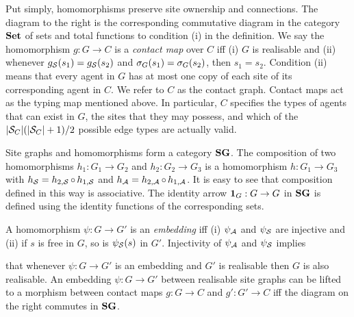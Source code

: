 Put simply, homomorphisms preserve site ownership and connections.
The diagram to the right is the corresponding
commutative diagram in the category $\mathbf{Set}$
of sets and total functions
to condition (i) in the definition.
We say the homomorphism $g: G \to C$ is
a \emph{contact map} over $C$ iff
(i) $G$ is realisable and
(ii) whenever $g_{\mathcal{S}}(s_1) = g_{\mathcal{S}}(s_2)$
and $\sigma_G(s_1) = \sigma_G(s_2)$, then $s_1 = s_2$.
Condition (ii) means that every agent in $G$ has at most
one copy of each site of its corresponding agent in $C$.
We refer to $C$ as the contact graph.
Contact maps act as the typing map mentioned above.
In particular,
$C$ specifies the types of agents that can exist in $G$,
the sites that they may possess,
and which of the $|\mathcal{S}_C|(|\mathcal{S}_C|+1)/2$
possible edge types are actually valid.

Site graphs and homomorphisms form a category $\mathbf{SG}$.
The composition of two homomorphisms
$h_1: G_1 \to G_2$ and $h_2: G_2 \to G_3$
is a homomorphism $h: G_1 \to G_3$ with
$h_{\mathcal{S}} = h_{2,\mathcal{S}} \operatorname*{\circ} h_{1,\mathcal{S}}$ and
$h_{\mathcal{A}} = h_{2,\mathcal{A}} \operatorname*{\circ} h_{1,\mathcal{A}}$.
It is easy to see that composition defined in this way is associative.
The identity arrow $\boldsymbol{\mathbf{1}}_G: G \to G$ in $\mathbf{SG}$ is defined
using the identity functions of the corresponding sets.

A homomorphism $\psi: G \to G'$ is an \emph{embedding} iff
(i) $\psi_{\mathcal{A}}$ and $\psi_{\mathcal{S}}$ are injective and
(ii) if $s$ is free in $G$, so is $\psi_{\mathcal{S}}(s)$ in $G'$.
Injectivity of $\psi_{\mathcal{A}}$ and $\psi_{\mathcal{S}}$ implies
\begin{wrapfigure}[4]{r}{0.28\textwidth}
  \vspace{-2em}
  \begin{center}
  \end{center}
\end{wrapfigure}
that whenever $\psi: G \to G'$ is an embedding
and $G'$ is realisable then $G$ is also realisable.
An embedding $\psi: G \to G'$ between realisable site graphs
can be lifted to a morphism between contact maps $g: G \to C$
and $g': G' \to C$ iff the diagram on the right commutes in $\mathbf{SG}$.

